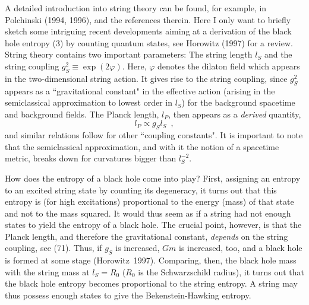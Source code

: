 \documentclass[12pt]{article}
\newcommand{\be}{\begin{equation}}
\newcommand{\ee}{\end{equation}}
\begin{document}
A detailed introduction into string theory can be found,
for example, in Polchinski (1994, 1996), and the references
therein. Here I only want to briefly sketch some intriguing recent
developments aiming at a derivation of the black hole entropy (3)
by counting quantum states, see Horowitz (1997) for a review.
String theory contains two important parameters: The string
length $l_S$ and the string coupling $g_S^2\equiv\exp(2\varphi)$.
Here, $\varphi$ denotes the dilaton field which appears in the
two-dimensional string action. It gives rise to the string coupling,
since $g_S^2$ appears as a ``gravitational constant"
 in the effective action (arising in the
semiclassical approximation to lowest order in $l_S$) for
the background spacetime and background fields. 
The Planck length, $l_P$, then appears as a {\em derived}
quantity,
 \be l_P\propto g_Sl_S \enspace , \ee
 and similar relations
follow for other ``coupling constants". 
It is important to note that the semiclassical approximation,
and with it the notion of a spacetime metric, breaks down
for curvatures bigger than $l_S^{-2}$.

How does the entropy of a black hole come into play?
First, assigning an entropy to an excited string state by counting
its degeneracy, it turns out that this entropy is (for high
excitations) proportional to the energy (mass) of that state and
not to the mass squared. It would thus seem as if a string had not
enough states to yield the entropy of a black hole.
The crucial point, however, is that the Planck length, and
therefore the gravitational constant, {\em depends} on the string coupling,
see (71). Thus, if $g_S$ is increased, $Gm$ is increased, too,
and a black hole is formed at some stage (Horowitz~1997).
Comparing, then, the black hole mass with the string mass
at $l_S=R_0$ ($R_0$ is the Schwarzschild radius), it turns out
that the black hole entropy becomes proportional to the string entropy.
A string may thus possess enough states to give the
Bekenstein-Hawking entropy.
\end{document}
